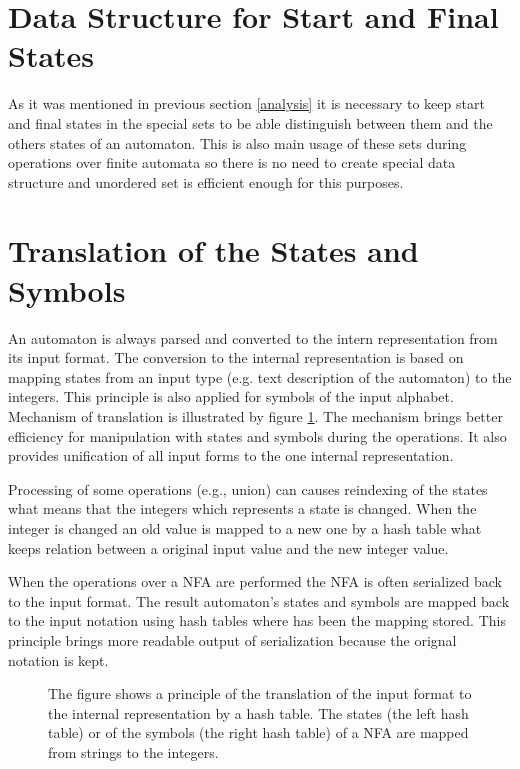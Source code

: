 \section{Data Structure for Start and Final States}
As it was mentioned in previous section \ref{analysis} it is necessary to keep start and final states in the special sets to 
be able distinguish between them and the others states of an automaton. This is also main usage of these sets during operations 
over finite automata so there is no need to create special data structure and unordered set is efficient enough for this purposes.

\section{Translation of the States and Symbols}
\label{sectionTranslate}
An automaton is always parsed and converted to the intern representation from its input format. 
The conversion to the internal representation is based on mapping states from an input type (e.g. text description of the automaton) 
to the integers. This principle is also applied for symbols of the input alphabet. 
Mechanism of translation is illustrated by figure \ref{figExplicitFATransl}. 
The mechanism brings better efficiency for manipulation with states and symbols
during the operations. It also provides unification of all input forms to the one internal representation. 

Processing of some operations (e.g., union) can causes reindexing of the states what means that the integers 
which represents a state is changed. When the integer is changed an old value is mapped to a new one by a hash table what keeps 
relation between a original input value and the new integer value.

When the operations over a NFA are performed the NFA is often serialized back to the input format. The result 
automaton's states and symbols are mapped back to the input notation using hash tables where has been the mapping stored. This
principle brings more readable output of serialization because the orignal notation is kept.

\begin{figure}[bt]
\begin{center}

    \caption{The figure shows a principle of the translation of the input format to the internal representation by a hash table. 
      The states (the left hash table) or of the symbols (the right hash table) of a NFA are mapped from strings to the integers.}
		\label{figExplicitFATransl}
\end{center}
\end{figure}

